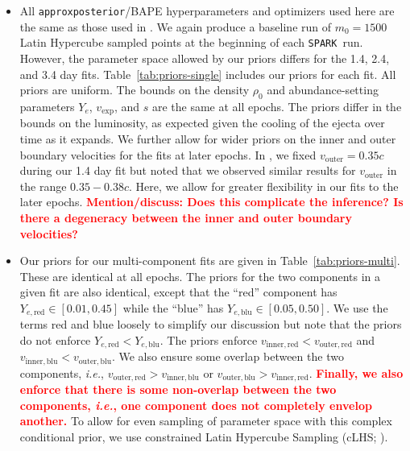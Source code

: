\documentclass[twocolumn, twocolappendix]{aastex63}
\def\SPARK{\texttt{SPARK}}
\newcommand\redbf[1]{\textbf{\textcolor{red}{#1}}}
\def\ie{{\it i.e.}}
\begin{document}
\begin{itemize}

    \item All \texttt{approxposterior}/BAPE hyperparameters and optimizers used here are the same as those used in \cite{vieira23}. We again produce a baseline run of $m_{0} = 1500$ Latin Hypercube sampled points at the beginning of each \SPARK~run. However, the parameter space allowed by our priors differs for the 1.4, 2.4, and 3.4 day fits. Table~\ref{tab:priors-single} includes our priors for each fit. All priors are uniform. The bounds on the density $\rho_0$ and abundance-setting parameters $Y_e$, $v_{\mathrm{exp}}$, and $s$ are the same at all epochs. The priors differ in the bounds on the luminosity, as expected given the cooling of the ejecta over time as it expands. We further allow for wider priors on the inner and outer boundary velocities for the fits at later epochs. In \cite{vieira23}, we fixed $v_{\mathrm{outer}} = 0.35c$ during our 1.4 day fit but noted that we observed similar results for $v_{\mathrm{outer}}$ in the range $0.35 - 0.38c$. Here, we allow for greater flexibility in our fits to the later epochs. \redbf{Mention/discuss: Does this complicate the inference? Is there a degeneracy between the inner and outer boundary velocities?}
    
    \item Our priors for our multi-component fits are given in Table~\ref{tab:priors-multi}. These are identical at all epochs. The priors for the two components in a given fit are also identical, except that the ``red'' component has $Y_{e,\mathrm{red}} \in [0.01, 0.45]$ while the ``blue'' has $Y_{e,\mathrm{blu}} \in [0.05, 0.50]$. We use the terms red and blue loosely to simplify our discussion but note that the priors do not enforce $Y_{e,\mathrm{red}} < Y_{e,\mathrm{blu}}$. The priors enforce $v_{\mathrm{inner,red}} < v_{\mathrm{outer,red}}$ and $v_{\mathrm{inner,blu}} < v_{\mathrm{outer,blu}}$. We also ensure some overlap between the two components, \ie, $v_{\mathrm{outer,red}} > v_{\mathrm{inner,blu}}$ or $v_{\mathrm{outer,blu}} > v_{\mathrm{inner,red}}$. \redbf{Finally, we also enforce that there is some non-overlap between the two components, \ie, one component does not completely envelop another.} To allow for even sampling of parameter space with this complex conditional prior, we use constrained Latin Hypercube Sampling (cLHS; \citealt{petelet09}).
    

\end{itemize}
\end{document}
